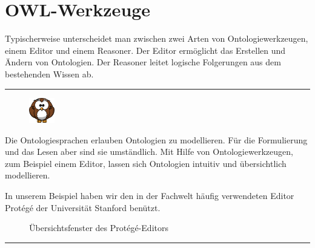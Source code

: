 \section{OWL-Werkzeuge}
\label{sec:owl_owl_OwlTools}
Typischerweise unterscheidet man zwischen zwei Arten von Ontologiewerkzeugen, einem Editor und einem Reasoner. Der Editor ermöglicht das Erstellen und Ändern von Ontologien. Der Reasoner leitet logische Folgerungen aus dem bestehenden Wissen ab.

\noindent\rule[1ex]{\textwidth}{1pt}
\begin{figure}
    \vspace{-19pt}
    \includegraphics[width=0.1\textwidth]{bilder/owl.png}
\end{figure}
Die Ontologiesprachen erlauben Ontologien zu modellieren. Für die Formulierung und das Lesen aber sind sie umständlich. Mit Hilfe von Ontologiewerkzeugen, zum Beispiel einem Editor, lassen sich Ontologien intuitiv und übersichtlich modellieren.

In unserem Beispiel haben wir den in der Fachwelt häufig verwendeten Editor Protégé der Universität Stanford benützt.

\begin{figure}[H]
\centering {}
\caption{Übersichtsfenster des Protégé-Editors\label{fig:protege}\protect\footnotemark}
\end{figure}
\noindent\rule[1ex]{\textwidth}{1pt}
